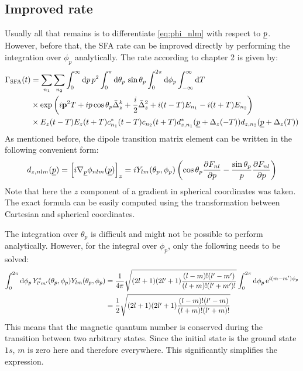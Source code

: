 \subsection*{Improved rate}
Usually all that remains is to differentiate \eqref{eq:phi_nlm} with respect to $\underline{p}$.
However, before that, the SFA rate can be improved directly by performing the integration over $\phi_p$ analytically.
The rate according to chapter 2 is given by:
\begin{align*}
    \Gamma_{\mathrm{SFA}}(t) &= \sum_{n_1}\sum_{n_2} \int_0^{\infty} \mathrm{d} p\,p^2\int_0^{\pi} \mathrm{d}\theta_p\,\sin\theta_p \int_0^{2\pi}\mathrm{d} \phi_p\int_{-\infty}^{\infty} \mathrm{d} T\\
    &\times \exp\left(i\mathbf{p}^2T + ip\cos\theta_p\bar{\Delta}_z^k +  \frac{i}{2}\bar{\Delta}_z^2  + i(t-T)E_{n_1}-i(t+T)E_{n_2}\right)\\
    &\times E_z(t-T) E_z(t+T)c_{n_1}^*(t-T)c_{n_2}(t+T) d_{z,n_1}^*(\underline{p}+\Delta_z(-T))d_{z,n_2}(\underline{p}+\Delta_z(T))
\end{align*}
As mentioned before, the dipole transition matrix element can be written in the following convenient form:
\begin{equation*}
    d_{z,nlm}(\underline{p}) = \left[i\nabla_{\underline{p}}\phi_{nlm}(\underline{p})\right]_z = iY_{lm}(\theta_p, \phi_p)\left(\cos\theta_p\frac{\partial F_{nl}}{\partial p}-\frac{\sin\theta_p}{p}\frac{\partial F_{nl}}{\partial p}\right)
\end{equation*}
Note that here the $z$ component of a gradient in spherical coordinates was taken. The exact formula can be easily computed using the transformation between Cartesian and spherical coordinates.

The integration over $\theta_p$ is difficult and might not be possible to perform analytically.
However, for the integral over $\phi_p$, only the following needs to be solved:
\begin{align*}
    \int_{0}^{2\pi}\mathrm{d} \phi_p\, Y_{l'm'}^*(\theta_p, \phi_p) Y_{lm}(\theta_p, \phi_p) &= \frac{1}{4\pi}\sqrt{(2l+1)(2l'+1)\frac{(l-m)!(l'-m')}{(l+m)!(l'+m')!}}\int_{0}^{2\pi}\mathrm{d} \phi_p\, \mathrm{e}^{i(m-m')\phi_p}\\
    &= \frac{1}{2}\sqrt{(2l+1)(2l'+1)\frac{(l-m)!(l'-m)}{(l+m)!(l'+m)!}}
\end{align*}
This means that the magnetic quantum number is conserved during the transition between two arbitrary states.
Since the initial state is the ground state $1s$, $m$ is zero here and therefore everywhere.
This significantly simplifies the expression.






